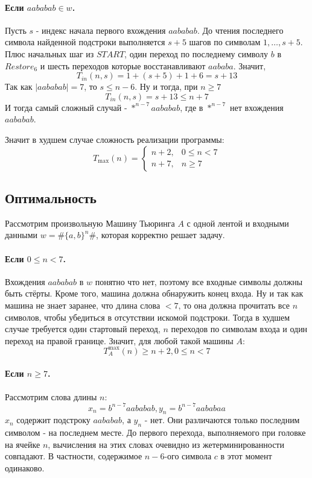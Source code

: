 \documentclass[12pt]{article}
\begin{document}
\paragraph{Если $aababab\in w$.}
Пусть $s$ - индекс начала первого вхождения $aababab$.
До чтения последнего символа найденной подстроки выполняется
$s+5$ шагов по символам $1,\ldots,s+5$.
Плюс начальных шаг из $START$, один переход
по последнему символу $b$ в $Restore_6$ и шесть переходов
которые восстанавливают $aababa$. Значит,
\[
T_{in}(n,s)
=1+(s+5)+1+6=s+13
\]
Так как $|aababab|=7$, то $s\leq n-6$.
Ну и тогда, при $n\geq7$
\[
T_{in}(n,s)=s+13\leq n+7
\]
И тогда самый сложный случай - $*^{n-7}aababab$, где 
в $*^{n-7}$ нет вхождения $aababab$.

Значит в худшем случае сложность реализации программы:
\[
T_{\max}(n)=
\begin{cases}
n+2, & 0\leq n<7\\
n+7, & n\geq7
\end{cases}
\]

\subsection*{Оптимальность}

Рассмотрим произвольную Машину Тьюринга $A$ с одной лентой и
входными данными $w=\#\{a,b\}^n\#$, которая корректно
решает задачу.

\paragraph{Если $0\leq n<7$.}
Вхождения $aababab$ в $w$ понятно что нет, поэтому все
входные символы должны быть стёрты. Кроме того, машина
должна обнаружить конец входа. Ну и так как машина не знает
заранее, что длина слова $<7$, то она должна прочитать все $n$
символов, чтобы убедиться в отсутствии искомой подстроки.
Тогда в худшем случае требуется один стартовый переход,
$n$ переходов по символам входа и один переход на правой границе.
Значит, для любой такой машины $A$:
\[
T_A^{\max}(n)\geq n+2, 0\leq n<7
\]

\paragraph{Если $n\geq7$.}
Рассмотрим слова длины $n$:
\[
x_n=b^{n-7}aababab,
y_n=b^{n-7}aababaa
\]
$x_n$ содержит подстроку $aababab$, а $y_n$ - нет. 
Они различаются только последним символом - на
последнем месте. До первого перехода, 
выполняемого при головке на ячейке $n$,
вычисления на этих словах очевидно из жетерминированности
совпадают. В частности, содержимое $n-6$-ого символа $c$
в этот момент одинаково.
\end{document}

